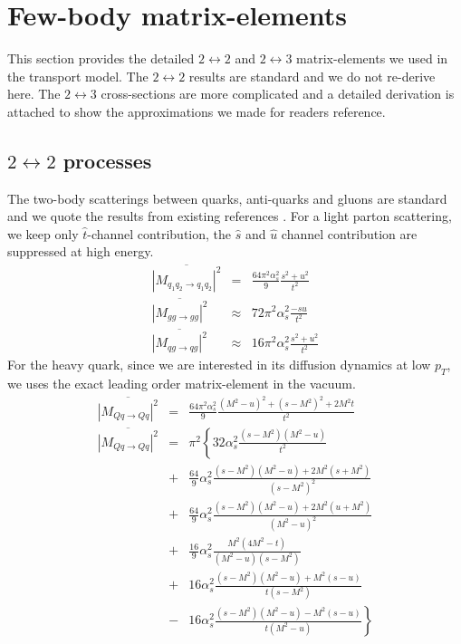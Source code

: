 \section{Few-body matrix-elements}
\label{transport:ME}
This section provides the detailed $2\leftrightarrow 2$ and $2\leftrightarrow 3$ matrix-elements we used in the transport model.
The $2\leftrightarrow 2$ results are standard and we do not re-derive here.
The $2\leftrightarrow 3$ cross-sections are more complicated and a detailed derivation is attached to show the approximations we made for readers reference.

\subsection{$2\leftrightarrow 2$ processes}
The two-body scatterings between quarks, anti-quarks and gluons are standard and we quote the results from existing references \cite{RevModPhys.59.465}.
For a light parton scattering, we keep only $\hat{t}$-channel contribution, the $\hat{s}$ and $\hat{u}$ channel contribution are suppressed at high energy.
\begin{eqnarray}
\overline{|M_{q_1q_2\rightarrow q_1q_2}|^2} &=& \frac{64\pi^2 \alpha_s^2}{9} \frac{s^2+u^2}{t^2} \\
\overline{|M_{gg\rightarrow gg}|^2} &\approx& 72\pi^2 \alpha_s^2 \frac{-su}{t^2}
 \\
\overline{|M_{qg\rightarrow qg}|^2} &\approx& 16\pi^2 \alpha_s^2 \frac{s^2+u^2}{t^2}
\end{eqnarray}
For the heavy quark, since we are interested in its diffusion dynamics at low $p_T$, we uses the exact leading order matrix-element in the vacuum.
\begin{eqnarray}
\overline{|M_{Qq\rightarrow Qq}|^2} &=& \frac{64\pi^2\alpha_s^2}{9} \frac{(M^2-u)^2 + (s-M^2)^2 + 2 M^2 t}{t^2}
\nonumber
\\
\overline{|M_{Qq\rightarrow Qq}|^2} &=& \pi^2 \left\{
32\alpha_s^2 \frac{(s-M^2)(M^2-u)}{t^2} \right.
\nonumber
\\
&+&\frac{64}{9}\alpha_s^2 \frac{(s-M^2)(M^2-u)+2M^2(s+M^2)}{(s-M^2)^2} \nonumber
\\
&+&\frac{64}{9}\alpha_s^2 \frac{(s-M^2)(M^2-u)+2M^2(u+M^2)}{(M^2-u)^2} \nonumber
\\
&+& \frac{16}{9}\alpha_s^2 \frac{M^2(4M^2 - t)}{(M^2-u)(s-M^2)} 
\nonumber
\\
&+& 16 \alpha_s^2 \frac{(s-M^2)(M^2-u)+M^2(s-u)}{t(s-M^2)}
\nonumber
\\
&-& \left. 16 \alpha_s^2 \frac{(s-M^2)(M^2-u)-M^2(s-u)}{t(M^2-u)}\right\}
\end{eqnarray}

